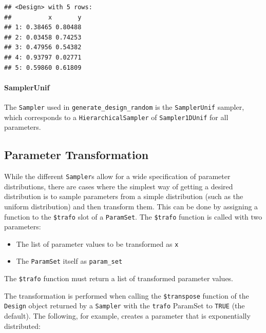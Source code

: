 \documentclass[]{scrbook}
\providecommand{\tightlist}{%
  \setlength{\itemsep}{0pt}\setlength{\parskip}{0pt}}
\let\oldparagraph\paragraph
\renewcommand{\paragraph}[1]{\oldparagraph{#1}\mbox{}}
\begin{document}
\begin{verbatim}
## <Design> with 5 rows:
##          x       y
## 1: 0.38465 0.80488
## 2: 0.03458 0.74253
## 3: 0.47956 0.54382
## 4: 0.93797 0.02771
## 5: 0.59860 0.61809
\end{verbatim}

\hypertarget{samplerunif}{%
\paragraph{SamplerUnif}\label{samplerunif}}

The \texttt{Sampler} used in \texttt{generate\_design\_random} is the \texttt{SamplerUnif} sampler, which corresponds to a \texttt{HierarchicalSampler} of \texttt{Sampler1DUnif} for all parameters.

\hypertarget{parameter-transformation}{%
\subsection{Parameter Transformation}\label{parameter-transformation}}

While the different \texttt{Sampler}s allow for a wide specification of parameter distributions, there are cases where the simplest way of getting a desired distribution is to sample parameters from a simple distribution (such as the uniform distribution) and then transform them.
This can be done by assigning a function to the \texttt{\$trafo} slot of a \texttt{ParamSet}.
The \texttt{\$trafo} function is called with two parameters:

\begin{itemize}
\tightlist
\item
  The list of parameter values to be transformed as \texttt{x}
\item
  The \texttt{ParamSet} itself as \texttt{param\_set}
\end{itemize}

The \texttt{\$trafo} function must return a list of transformed parameter values.

The transformation is performed when calling the \texttt{\$transpose} function of the \texttt{Design} object returned by a \texttt{Sampler} with the \texttt{trafo} ParamSet to \texttt{TRUE} (the default).
The following, for example, creates a parameter that is exponentially distributed:
\end{document}

